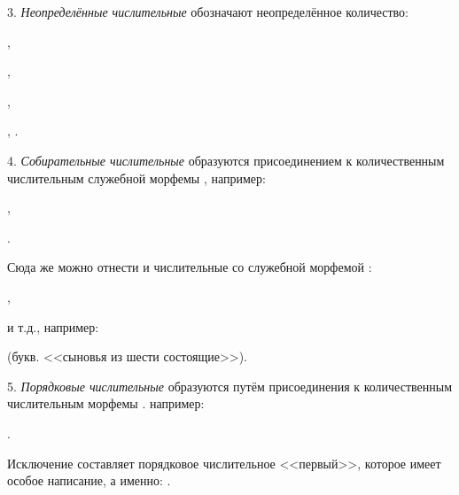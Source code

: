 3. \emph{Неопределённые числительные} обозначают неопределённое количество:
\begin{prfsample}
    \item {},
    \item {},
    \item {},
    \item {}, .
\end{prfsample}

4. \emph{Собирательные числительные} образуются присоединением к количественным числительным служебной морфемы , например:
\begin{prfsample}
    \item {},
    \item {}.
\end{prfsample}

Сюда же можно отнести и числительные со служебной морфемой :
\begin{prfsample}
    \item {},
    \item {}
\end{prfsample}
и т.д., например:
\begin{prfsample}
    \item {} (букв. <<сыновья из шести состоящие>>).
\end{prfsample}

5. \emph{Порядковые числительные} образуются путём присоединения к количественным числительным морфемы . например:
\begin{prfsample}
    \item {}.
\end{prfsample}
Исключение составляет порядковое числительное <<первый>>, которое имеет особое написание, а именно: .

